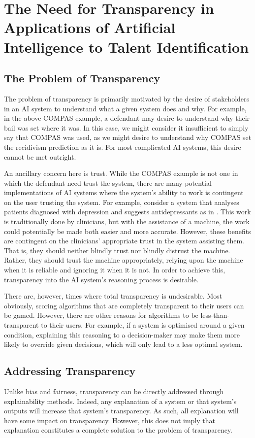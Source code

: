 \section{The Need for Transparency in Applications of Artificial Intelligence to Talent Identification}
\subsection{The Problem of Transparency}
The problem of transparency is primarily motivated by the desire of stakeholders in an AI system to understand what a given system does and why. For example, in the above COMPAS example, a defendant may desire to understand why their bail was set where it was. In this case, we might consider it insufficient to simply say that COMPAS was used, as we might desire to understand why COMPAS set the recidivism prediction as it is. For most complicated AI systems, this desire cannot be met outright.

An ancillary concern here is trust. While the COMPAS example is not one in which the defendant need trust the system, there are many potential implementations of AI systems where the system's ability to work is contingent on the user trusting the system. For example, consider a system that analyses patients diagnosed with depression and suggests antidepressants as in \textcite{jacobs_how_2021}. This work is traditionally done by clinicians, but with the assistance of a machine, the work could potentially be made both easier and more accurate. However, these benefits are contingent on the clinicians' appropriate trust in the system assisting them. That is, they should neither blindly trust nor blindly distrust the machine. Rather, they should trust the machine appropriately, relying upon the machine when it is reliable and ignoring it when it is not. In order to achieve this, transparency into the AI system's reasoning process is desirable.

There are, however, times where total transparency is undesirable. Most obviously, scoring algorithms that are completely transparent to their users can be gamed. However, there are other reasons for algorithms to be less-than-transparent to their users. For example, if a system is optimised around a given condition, explaining this reasoning to a decision-maker may make them more likely to override given decisions, which will only lead to a less optimal system.

\subsection{Addressing Transparency}
Unlike bias and fairness, transparency can be directly addressed through explainability methods. Indeed, any explanation of a system or that system's outputs will increase that system's transparency. As such, all explanation will have some impact on transparency. However, this does not imply that explanation constitutes a complete solution to the problem of transparency. 

